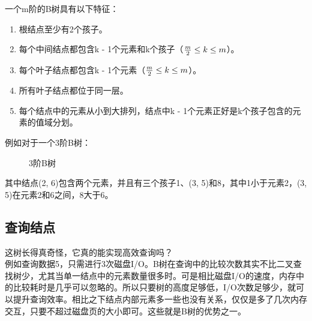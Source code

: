 一个m阶的B树具有以下特征：

\begin{enumerate}
	\item 根结点至少有2个孩子。

	\item 每个中间结点都包含k - 1个元素和k个孩子（$ {m \over 2} \le k \le m $）。

	\item 每个叶子结点都包含k - 1个元素（$ {m \over 2} \le k \le m $）。

	\item 所有叶子结点都位于同一层。

	\item 每个结点中的元素从小到大排列，结点中k - 1个元素正好是k个孩子包含的元素的值域分划。
\end{enumerate}

例如对于一个3阶B树：

\begin{figure}[H]
	\centering
	\caption{3阶B树}
\end{figure}

其中结点(2, 6)包含两个元素，并且有三个孩子1、(3, 5)和8，其中1小于元素2，(3, 5)在元素2和6之间，8大于6。\\

\subsection{查询结点}

这树长得真奇怪，它真的能实现高效查询吗？\\

例如查询数据5，只需进行3次磁盘I/O。B树在查询中的比较次数其实不比二叉查找树少，尤其当单一结点中的元素数量很多时。可是相比磁盘I/O的速度，内存中的比较耗时是几乎可以忽略的。所以只要树的高度足够低，I/O次数足够少，就可以提升查询效率。相比之下结点内部元素多一些也没有关系，仅仅是多了几次内存交互，只要不超过磁盘页的大小即可。这些就是B树的优势之一。\\

